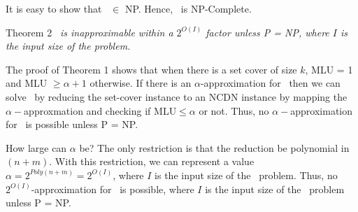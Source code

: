 {It is easy to show that \optloc\ $\in$ NP. Hence, \optloc\ is NP-Complete.
\vspace{0.3in}

{{\sc Theorem 2}} {\em  \optloc\ is inapproximable within a $2^{O(I)}$ factor unless P = NP, where $I$ is the input size of the problem.}

\vspace{0.1in}
The proof of {\sc Theorem 1} shows that when there is a set cover of size $k$, MLU = 1 and MLU $\geq \alpha +1$ otherwise. If there is an $\alpha$-approximation for \optloc\ then we can solve \setcover\ by reducing the set-cover instance to an NCDN instance by mapping the $\alpha-$approxmation and checking if MLU$ \leq \alpha $ or not. Thus, no $\alpha-$approximation for \optloc\ is possible unless P = NP. 


How large can $\alpha$ be? The only restriction is that the reduction be polynomial in $(n + m)$. With this restriction, we can represent a value $\alpha = 2^{{\textit{Poly}}(n+m)} =2^{O(I)}$, where $I$ is the input size of the \optloc\ problem. Thus, no $2^{O(I)}$-approximation for \optloc\ is possible, where $I$ is the input size of the \optloc\ problem unless P = NP. 
}





